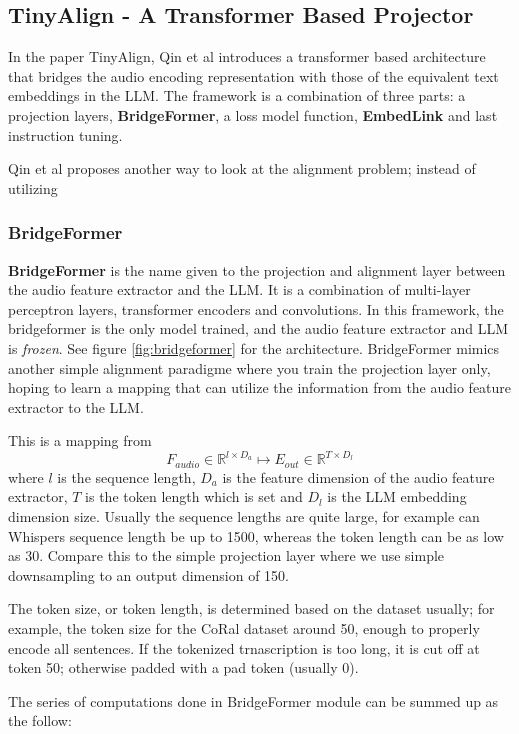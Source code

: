 \subsection{TinyAlign - A Transformer Based Projector}

In the paper TinyAlign, Qin et al introduces a transformer based architecture that bridges the audio encoding representation with those of the equivalent text embeddings in the LLM. The framework is a combination of three parts: a projection layers, \textbf{BridgeFormer}, a loss model function, \textbf{EmbedLink} and last instruction tuning.

Qin et al proposes another way to look at the alignment problem; instead of utilizing 

\subsubsection*{BridgeFormer}

\textbf{BridgeFormer} is the name given to the projection and alignment layer between the audio feature extractor and the LLM. It is a combination of multi-layer perceptron layers, transformer encoders and convolutions. In this framework, the bridgeformer is the only model trained, and the audio feature extractor and LLM is \textit{frozen}. See figure \ref{fig:bridgeformer} for the architecture. BridgeFormer mimics another simple alignment paradigme where you train the projection layer only, hoping to learn a mapping that can utilize the information from the audio feature extractor to the LLM.

This is a mapping from 
$$F_{audio} \in \mathbb{R}^{l\times D_a} \mapsto E_{out} \in \mathbb{R}^{T\times D_l}$$
where $l$ is the sequence length, $D_a$ is the feature dimension of the audio feature extractor, $T$ is the token length which is set and $D_l$ is the LLM embedding dimension size. Usually the sequence lengths are quite large, for example can Whispers sequence length be up to 1500, whereas the token length can be as low as 30. Compare this to the simple projection layer where we use simple downsampling to an output dimension of 150.

The token size, or token length, is determined based on the dataset usually; for example, the token size for the CoRal dataset around 50, enough to properly encode all sentences. If the tokenized trnascription is too long, it is cut off at token 50; otherwise padded with a pad token (usually 0).

The series of computations done in BridgeFormer module can be summed up as the follow:

